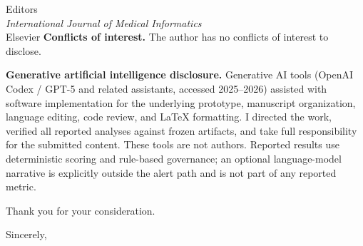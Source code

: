 \documentclass[10pt]{letter}
\begin{document}
\begin{letter}{Editors\\
\textit{International Journal of Medical Informatics}\\
Elsevier}
\textbf{Conflicts of interest.}
The author has no conflicts of interest to disclose.

\textbf{Generative artificial intelligence disclosure.}
Generative AI tools (OpenAI Codex / GPT-5 and related assistants, accessed
2025--2026) assisted with software implementation for the underlying prototype,
manuscript organization, language editing, code review, and \LaTeX{} formatting.
I directed the work, verified all reported analyses against frozen artifacts,
and take full responsibility for the submitted content. These tools are not
authors. Reported results use deterministic scoring and rule-based governance;
an optional language-model narrative is explicitly outside the alert path and
is not part of any reported metric.

Thank you for your consideration.

\closing{Sincerely,}

\end{letter}
\end{document}
